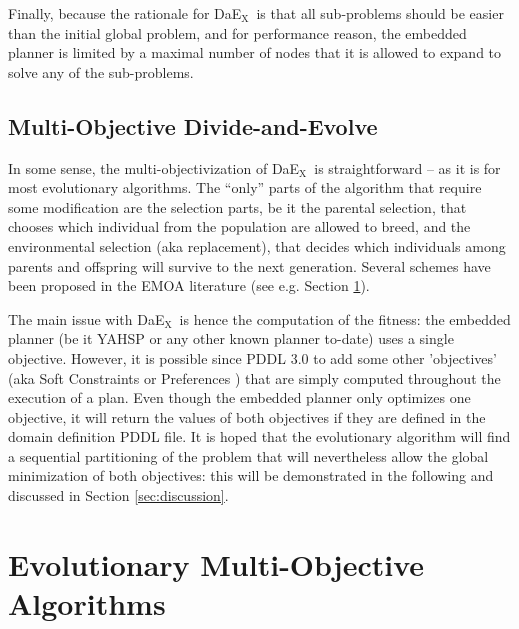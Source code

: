 \documentclass{llncs}
\def\DAEX{{\sc DaE$_{\text{X}}$}}
\begin{document}
Finally, because the rationale for \DAEX\ is that all sub-problems should be easier than the initial global problem, and for performance reason, the embedded planner is limited by a maximal number of nodes that it is allowed to expand to solve any of the sub-problems.
 
\subsection{Multi-Objective Divide-and-Evolve}
\label{modae}
In some sense, the multi-objectivization of \DAEX\ is straightforward -- as it is for most evolutionary algorithms. The ``only'' parts of the algorithm that require some modification are the selection parts, be it the parental selection, that chooses which individual from the population are allowed to breed, and the environmental selection (aka replacement), that decides which individuals among parents and offspring will survive to the next generation. Several schemes have been proposed in the EMOA literature (see e.g. Section \ref{sec:evolutionaryMOA}). 

The main issue with \DAEX\ is hence the computation of the fitness: the embedded planner (be it YAHSP or any other known planner to-date) uses a single objective. However, it is possible since PDDL 3.0 to add some other 'objectives' (aka Soft Constraints or Preferences \cite{gerevini2006preferences}) that are simply computed throughout the execution of a plan. Even though the embedded planner only optimizes one objective, it will return the values of both objectives if they are defined in the domain definition PDDL file. It is hoped that the evolutionary algorithm will find a sequential partitioning of the problem that will nevertheless allow the global minimization of both objectives: this will be demonstrated in the following and discussed in Section \ref{sec:discussion}.


\section{Evolutionary Multi-Objective Algorithms}
\label{sec:evolutionaryMOA}
\end{document}
